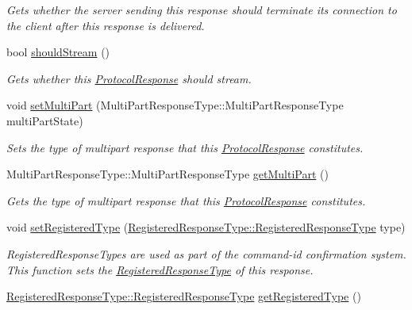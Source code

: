 \begin{DoxyCompactItemize}
\begin{DoxyCompactList}\small\item\em Gets whether the server sending this response should terminate its connection to the client after this response is delivered. \end{DoxyCompactList}\item 
bool \hyperlink{struct_picto_1_1_protocol_response_a3c320aa18ca6e34f3f7307d622505db1}{should\-Stream} ()
\begin{DoxyCompactList}\small\item\em Gets whether this \hyperlink{struct_picto_1_1_protocol_response}{Protocol\-Response} should stream. \end{DoxyCompactList}\item 
void \hyperlink{struct_picto_1_1_protocol_response_a55fdab74a0a0ce20a399a6718032d83b}{set\-Multi\-Part} (Multi\-Part\-Response\-Type\-::\-Multi\-Part\-Response\-Type multi\-Part\-State)
\begin{DoxyCompactList}\small\item\em Sets the type of multipart response that this \hyperlink{struct_picto_1_1_protocol_response}{Protocol\-Response} constitutes. \end{DoxyCompactList}\item 
Multi\-Part\-Response\-Type\-::\-Multi\-Part\-Response\-Type \hyperlink{struct_picto_1_1_protocol_response_aa80084e9a7b484e944142cdac18145ea}{get\-Multi\-Part} ()
\begin{DoxyCompactList}\small\item\em Gets the type of multipart response that this \hyperlink{struct_picto_1_1_protocol_response}{Protocol\-Response} constitutes. \end{DoxyCompactList}\item 
void \hyperlink{struct_picto_1_1_protocol_response_aa5910317b77d6d533f975d55d54cfe9b}{set\-Registered\-Type} (\hyperlink{namespace_picto_1_1_registered_response_type_abc60624d7d7b5a5d029fdaf2404311d2}{Registered\-Response\-Type\-::\-Registered\-Response\-Type} type)
\begin{DoxyCompactList}\small\item\em Registered\-Response\-Types are used as part of the command-\/id confirmation system. This function sets the \hyperlink{namespace_picto_1_1_registered_response_type}{Registered\-Response\-Type} of this response. \end{DoxyCompactList}\item 
\hypertarget{struct_picto_1_1_protocol_response_afc7c3b300135dd90203860c85d59d4dc}{\hyperlink{namespace_picto_1_1_registered_response_type_abc60624d7d7b5a5d029fdaf2404311d2}{Registered\-Response\-Type\-::\-Registered\-Response\-Type} \hyperlink{struct_picto_1_1_protocol_response_afc7c3b300135dd90203860c85d59d4dc}{get\-Registered\-Type} ()}\label{struct_picto_1_1_protocol_response_afc7c3b300135dd90203860c85d59d4dc}


\end{DoxyCompactItemize}
